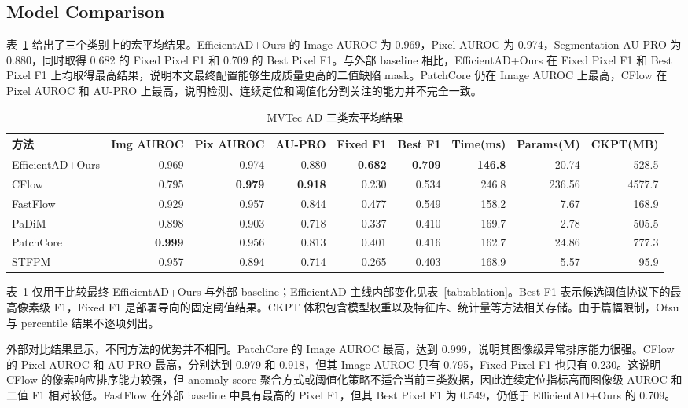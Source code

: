 \documentclass[letterpaper]{article}
\newcommand{\method}{EfficientAD+Ours}
\begin{document}
\subsection{Model Comparison}

表~\ref{tab:main} 给出了三个类别上的宏平均结果。\method{} 的 Image AUROC 为 0.969，Pixel AUROC 为 0.974，Segmentation AU-PRO 为 0.880，同时取得 0.682 的 Fixed Pixel F1 和 0.709 的 Best Pixel F1。与外部 baseline 相比，\method{} 在 Fixed Pixel F1 和 Best Pixel F1 上均取得最高结果，说明本文最终配置能够生成质量更高的二值缺陷 mask。PatchCore 仍在 Image AUROC 上最高，CFlow 在 Pixel AUROC 和 AU-PRO 上最高，说明检测、连续定位和阈值化分割关注的能力并不完全一致。

\begin{table}[t]
\centering
\caption{MVTec AD 三类宏平均结果}
\scriptsize
\setlength{\tabcolsep}{3.8pt}
\begin{tabular}{lrrrrrrrr}
\toprule
方法 & Img AUROC & Pix AUROC & AU-PRO & Fixed F1 & Best F1 & Time(ms) & Params(M) & CKPT(MB) \\
\midrule
\method{} & 0.969 & 0.974 & 0.880 & \textbf{0.682} & \textbf{0.709} & \textbf{146.8} & 20.74 & 528.5 \\
CFlow & 0.795 & \textbf{0.979} & \textbf{0.918} & 0.230 & 0.534 & 246.8 & 236.56 & 4577.7 \\
FastFlow & 0.929 & 0.957 & 0.844 & 0.477 & 0.549 & 158.2 & 7.67 & 168.9 \\
PaDiM & 0.898 & 0.903 & 0.718 & 0.337 & 0.410 & 169.7 & 2.78 & 505.5 \\
PatchCore & \textbf{0.999} & 0.956 & 0.813 & 0.401 & 0.416 & 162.7 & 24.86 & 777.3 \\
STFPM & 0.957 & 0.894 & 0.714 & 0.265 & 0.403 & 168.9 & 5.57 & 95.9 \\
\bottomrule
\end{tabular}
\vspace{2pt}
\parbox{0.98\textwidth}{\scriptsize
表~\ref{tab:main} 仅用于比较最终 \method{} 与外部 baseline；EfficientAD 主线内部变化见表~\ref{tab:ablation}。Best F1 表示候选阈值协议下的最高像素级 F1，Fixed F1 是部署导向的固定阈值结果。CKPT 体积包含模型权重以及特征库、统计量等方法相关存储。由于篇幅限制，Otsu 与 percentile 结果不逐项列出。
}
\label{tab:main}
\end{table}

外部对比结果显示，不同方法的优势并不相同。PatchCore 的 Image AUROC 最高，达到 0.999，说明其图像级异常排序能力很强。CFlow 的 Pixel AUROC 和 AU-PRO 最高，分别达到 0.979 和 0.918，但其 Image AUROC 只有 0.795，Fixed Pixel F1 也只有 0.230。这说明 CFlow 的像素响应排序能力较强，但 anomaly score 聚合方式或阈值化策略不适合当前三类数据，因此连续定位指标高而图像级 AUROC 和二值 F1 相对较低。FastFlow 在外部 baseline 中具有最高的 Pixel F1，但其 Best Pixel F1 为 0.549，仍低于 \method{} 的 0.709。
\end{document}
